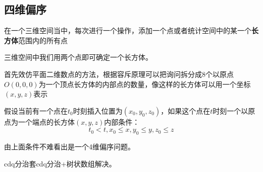 \subsection{四维偏序}
\begin{tcolorbox}
\par \noindent 在一个三维空间当中，每次进行一个操作，添加一个点或者统计空间中的某一个\textbf{长方体}范围内的所有点
\end{tcolorbox}

\par \noindent 三维空间中我们用两个点即可确定一个长方体。
~\\
\par \noindent 首先效仿平面二维数点的方法，根据容斥原理可以把询问拆分成8个以原点$O(0,0,0)$为一个顶点长方体的内部点的数量，像这样的长方体可以用一个坐标$(x,y,z)$表示
~\\
\par \noindent 假设当前有一个点在$t_0$时刻插入位置为$(x_0,y_0,z_0)$，如果这个点在$t$时刻一个以原点为一个端点的长方体$(x,y,z)$内部条件：
$$
t_0<t,x_0\leq x,y_0\leq y,z_0\leq z
$$
\par \noindent 由上面条件不难看出是一个4维偏序问题。
~\\
\par \noindent cdq分治套cdq分治+树状数组解决。
